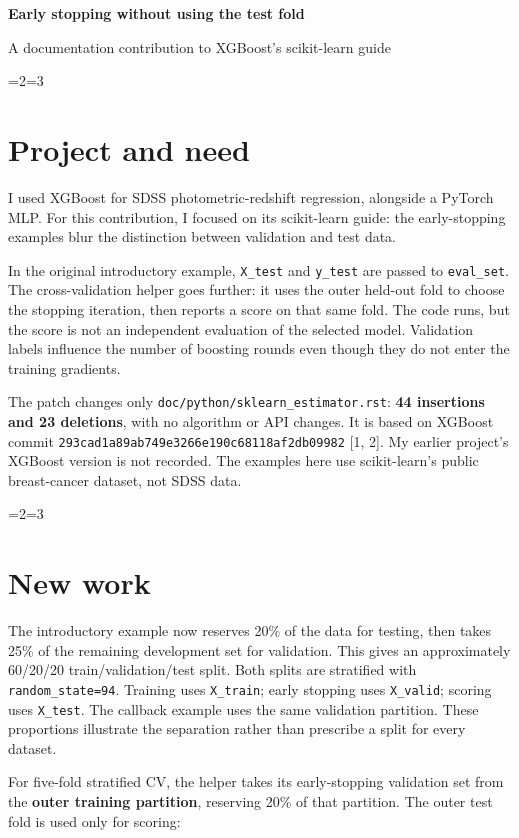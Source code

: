 \documentclass[10pt,letterpaper]{article}
\let\oldsection\section
\renewcommand{\section}{\ifnum\value{section}=2\clearpage\fi\ifnum\value{section}=3\clearpage\fi\oldsection}
\begin{document}
{\LARGE\bfseries Early stopping without using the test fold}\par
\vspace{2pt}
{\small A documentation contribution to XGBoost's scikit-learn guide}\par
\section{Project and need}\label{project-and-need}

I used XGBoost for SDSS photometric-redshift regression, alongside a
PyTorch MLP. For this contribution, I focused on its scikit-learn guide:
the early-stopping examples blur the distinction between validation and
test data.

In the original introductory example, \texttt{X\_test} and
\texttt{y\_test} are passed to \texttt{eval\_set}. The cross-validation
helper goes further: it uses the outer held-out fold to choose the
stopping iteration, then reports a score on that same fold. The code
runs, but the score is not an independent evaluation of the selected
model. Validation labels influence the number of boosting rounds even
though they do not enter the training gradients.

The patch changes only \texttt{doc/python/sklearn\_estimator.rst}:
\textbf{44 insertions and 23 deletions}, with no algorithm or API
changes. It is based on XGBoost commit
\texttt{293cad1a89ab749e3266e190c68118af2db09982} {[}1, 2{]}. My earlier
project's XGBoost version is not recorded. The examples here use
scikit-learn's public breast-cancer dataset, not SDSS data.

\section{New work}\label{new-work}

The introductory example now reserves 20\% of the data for testing, then
takes 25\% of the remaining development set for validation. This gives
an approximately 60/20/20 train/validation/test split. Both splits are
stratified with \texttt{random\_state=94}. Training uses
\texttt{X\_train}; early stopping uses \texttt{X\_valid}; scoring uses
\texttt{X\_test}. The callback example uses the same validation
partition. These proportions illustrate the separation rather than
prescribe a split for every dataset.

For five-fold stratified CV, the helper takes its early-stopping
validation set from the \textbf{outer training partition}, reserving
20\% of that partition. The outer test fold is used only for scoring:
\end{document}
